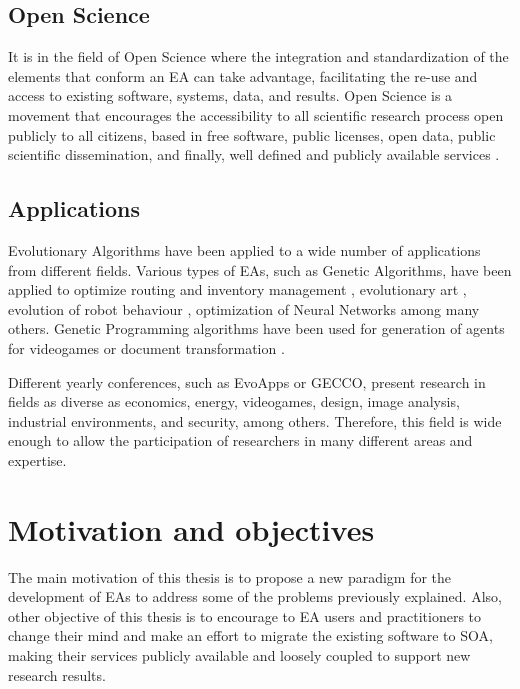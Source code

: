 \subsection{Open Science}
It is in the field of Open Science \cite{Altunay2011OpenScience} where the integration and standardization of
the elements that conform an EA can take advantage, facilitating the re-use and access to existing software, systems, data, and results. Open Science is a movement that encourages the accessibility to all scientific research process open publicly to all citizens, based in free software, public licenses, open data, public scientific dissemination, and finally, well defined and publicly available services \cite{Foster2005Science}.


\subsection{Applications}
Evolutionary Algorithms have been applied to a wide number of applications from different fields. Various types of EAs, such as Genetic Algorithms, have been applied to optimize routing and inventory management \cite{Esparcia2009EVITA}, evolutionary art \cite{Garcia2013RGB}, evolution of robot behaviour \cite{Garcia2012testing}, optimization of Neural Networks \cite{Castillo1999gprop} among many others. Genetic Programming algorithms have been used for generation of agents for videogames \cite{Esparcia2013GPunreal} or document transformation \cite{Garcia2008XSLT}. 

Different yearly conferences, such as EvoApps or GECCO, present research in fields as diverse as economics, energy, videogames, design, image analysis, industrial environments, and security, among others. Therefore, this field is wide enough to allow the participation of researchers in many different areas and expertise.







\section{Motivation and objectives}
\label{sec:intro:motivation}
The main motivation of this thesis is to propose a new paradigm for the development of EAs to address some of the problems previously explained. Also, other objective of this thesis is to encourage to EA users and practitioners to change their mind and make an effort to migrate the existing software to SOA, making their services publicly available and loosely coupled to support new research results.

